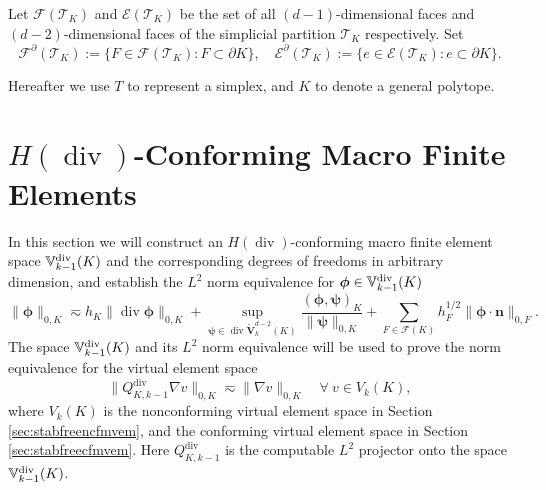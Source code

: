 \documentclass[10pt]{amsart}
\renewcommand{\div}{\operatorname{div}}
\numberwithin{equation}{section}
\begin{document}
Let $\mathcal{F}(\mathcal T_K)$ and $\mathcal{E}(\mathcal T_K)$ be the set of all $(d-1)$-dimensional faces and $(d-2)$-dimensional faces of the simplicial partition $\mathcal T_K$ respectively. Set 
\[
\mathcal{F}^{\partial}(\mathcal T_K):=\{F\in\mathcal{F}(\mathcal T_K): F\subset\partial K\},\quad \mathcal{E}^{\partial}(\mathcal T_K):=\{e\in\mathcal{E}(\mathcal T_K): e\subset\partial K\}.
\]

Hereafter we use $T$ to represent a simplex, and $K$ to denote a general polytope.




\section{$H(\div)$-Conforming Macro Finite Elements}\label{sec:divmacrofem}
In this section we will construct an $H(\div)$-conforming macro finite element space $\mathbb{V}_{k-1}^{\rm div}(K)$ and the corresponding degrees of freedoms in arbitrary dimension, and establish the $L^2$ norm equivalence for $\boldsymbol{\phi}\in\mathbb{V}_{k-1}^{\rm div}(K)$
\begin{equation*}%
\|\boldsymbol{\phi}\|_{0,K}\eqsim h_K\|\div\boldsymbol{\phi}\|_{0,K} + \sup_{\boldsymbol{\psi}\in\div\mathring{\boldsymbol{V}}_{k}^{d-2}(K)}\frac{(\boldsymbol{\phi}, \boldsymbol{\psi})_K}{\|\boldsymbol{\psi}\|_{0,K}} +\sum_{F\in\mathcal F(K)}h_F^{1/2}\|\boldsymbol{\phi}\cdot\boldsymbol{n}\|_{0,F}.
\end{equation*}
The space $\mathbb{V}_{k-1}^{\rm div}(K)$ and its $L^2$ norm equivalence will be used to prove
the norm equivalence for the virtual element space
\begin{equation*}%
\|Q_{K,k-1}^{\div}\nabla v\|_{0,K}\eqsim \|\nabla v\|_{0,K} \quad \forall~v\in V_k(K),
\end{equation*}
where $V_k(K)$ is the nonconforming virtual element space in Section \ref{sec:stabfreencfmvem}, and the conforming virtual element space in Section \ref{sec:stabfreecfmvem}. Here $Q_{K,k-1}^{\div}$ is the computable $L^2$ projector onto the space $\mathbb{V}_{k-1}^{\rm div}(K)$.
\end{document}
